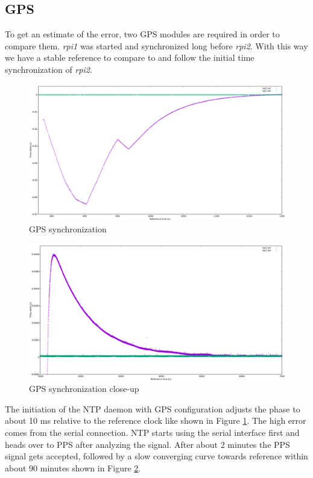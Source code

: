 \subsection{GPS}

To get an estimate of the error, two GPS modules are required in order to compare them. \textit{rpi1} was started and synchronized long before \textit{rpi2}. With this way we have a stable reference to compare to and follow the initial time synchronization of \textit{rpi2}.

\begin{figure}[tb]
	\centering
	\includegraphics[width=1.0\textwidth]{figures/plot_gps1.png}
	\caption{GPS synchronization}
	\label{fig:plot_gps1}
\end{figure}

\begin{figure}[tb]
	\centering
	\includegraphics[width=1.0\textwidth]{figures/plot_gps2.png}
	\caption{GPS synchronization close-up}
	\label{fig:plot_gps2}
\end{figure}

The initiation of the NTP daemon with GPS configuration adjusts the phase to about 10 ms relative to the reference clock like shown in Figure \ref{fig:plot_gps1}. The high error comes from the serial connection. NTP starts using the serial interface first and heads over to PPS after analyzing the signal. After about 2 minutes the PPS signal gets accepted, followed by a slow converging curve towards reference within about 90 minutes shown in Figure \ref{fig:plot_gps2}.

